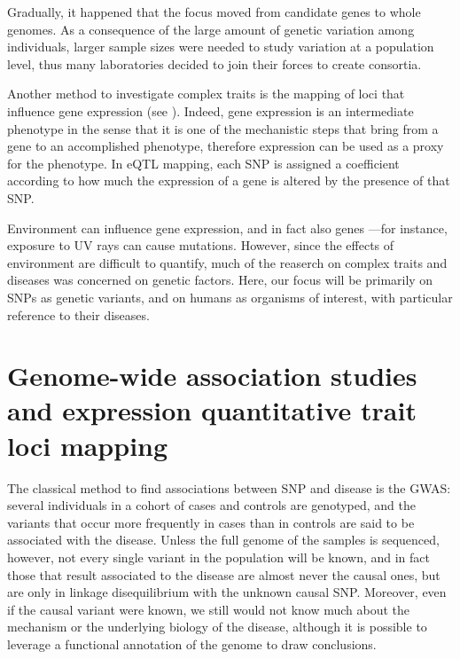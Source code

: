 \documentclass[../main.tex]{subfiles}
\begin{document}
Gradually, it happened that the focus moved from candidate genes to 
whole genomes. As a consequence of the large amount of genetic variation 
among individuals, larger sample sizes were needed to study variation at 
a population level, thus many laboratories decided to join their forces 
to create consortia.

Another method to investigate complex traits is the mapping of loci that 
influence gene expression (see ). Indeed, gene expression 
is an intermediate phenotype in the sense that it is one of the 
mechanistic steps that bring from a gene to an accomplished phenotype, 
therefore expression can be used as a proxy for the phenotype. In eQTL 
mapping, each SNP is assigned a coefficient according to how much the 
expression of a gene is altered by the presence of that SNP.

Environment can influence gene expression, and in fact also genes ---for 
instance, exposure to UV rays can cause mutations. However, since the 
effects of environment are difficult to quantify, much of the reaserch 
on complex traits and diseases was concerned on genetic factors. Here, 
our focus will be primarily on SNPs as genetic variants, and on humans 
as organisms of interest, with particular reference to their diseases.

\section{Genome-wide association studies and expression quantitative 
	trait loci mapping}


The classical method to find associations between SNP and disease is the 
GWAS: several individuals in a cohort of cases and controls are 
genotyped, and the variants that occur more frequently in cases than in 
controls are said to be associated with the disease. Unless the full 
genome of the samples is sequenced, however, not every single variant in 
the population will be known, and in fact those that result associated 
to the disease are almost never the causal ones, but are only in linkage 
disequilibrium with the unknown causal SNP\cite{Visscher2012}. Moreover, 
even if the causal variant were known, we still would not know much 
about the mechanism or the underlying biology of the disease, although 
it is possible to leverage a functional annotation of the genome to draw 
conclusions.
\end{document}
